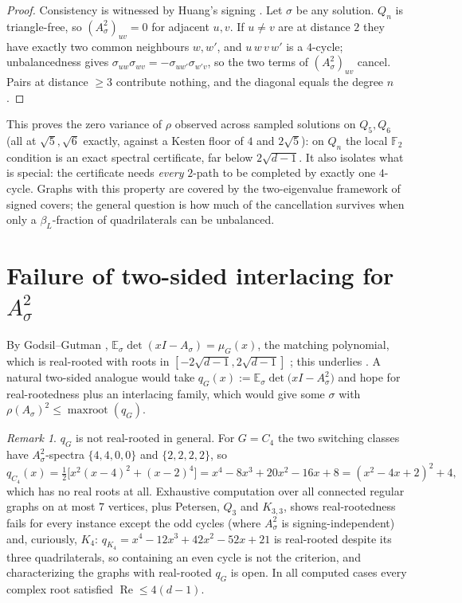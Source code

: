 \documentclass[11pt]{article}
\theoremstyle{remark}
\newtheorem{remark}[lemma]{Remark}
\newcommand{\F}{\mathbb{F}}
\newcommand{\rhomax}{\rho}
\begin{document}
\begin{proof}
Consistency is witnessed by Huang's signing \cite{huang19}. Let $\sigma$
be any solution. $Q_n$ is triangle-free, so
$(A_\sigma^2)_{uv}=0$ for adjacent $u,v$. If $u\ne v$ are at distance
$2$ they have exactly two common neighbours $w,w'$, and
$u\,w\,v\,w'$ is a $4$-cycle; unbalancedness gives
$\sigma_{uw}\sigma_{wv}=-\sigma_{uw'}\sigma_{w'v}$, so the two terms of
$(A_\sigma^2)_{uv}$ cancel. Pairs at distance $\ge3$ contribute nothing,
and the diagonal equals the degree $n$.
\end{proof}

This proves the zero variance of $\rhomax$ observed across sampled solutions on $Q_5,Q_6$ (all at $\sqrt5,\sqrt6$ exactly, against a Kesten
floor of $4$ and $2\sqrt5$): on $Q_n$ the local $\F_2$ condition is an
exact spectral certificate, far below $2\sqrt{d-1}$. It also isolates
what is special: the certificate needs \emph{every} $2$-path to be
completed by exactly one $4$-cycle. Graphs with this property are
covered by the two-eigenvalue framework of signed covers; the general
question is how much of the cancellation survives when only a
$\beta_L$-fraction of quadrilaterals can be unbalanced.


\section{Failure of two-sided interlacing for $A_\sigma^2$}

By Godsil--Gutman \cite{godsilgutman81},
$\mathbb{E}_\sigma\det(xI-A_\sigma)=\mu_G(x)$, the matching polynomial,
which is real-rooted with roots in $[-2\sqrt{d-1},2\sqrt{d-1}]$
\cite{heilmannlieb72}; this underlies \cite{mss15}. A natural two-sided
analogue would take
$q_G(x):=\mathbb{E}_\sigma\det\!\big(xI-A_\sigma^2\big)$ and hope for
real-rootedness plus an interlacing family, which would give some
$\sigma$ with $\rhomax(A_\sigma)^2\le\operatorname{maxroot}(q_G)$.

\begin{remark}\label{rem:qG}
$q_G$ is not real-rooted in general. For $G=C_4$ the two switching
classes have $A_\sigma^2$-spectra $\{4,4,0,0\}$ and $\{2,2,2,2\}$, so
\[
q_{C_4}(x)=\tfrac12\big[x^2(x-4)^2+(x-2)^4\big]
=x^4-8x^3+20x^2-16x+8=(x^2-4x+2)^2+4,
\]
which has no real roots at all. Exhaustive computation over all
connected regular graphs on at most $7$ vertices, plus Petersen, $Q_3$
and $K_{3,3}$, shows real-rootedness fails for every instance except the odd cycles
(where $A_\sigma^2$ is signing-independent) and, curiously, $K_4$:
$q_{K_4}=x^4-12x^3+42x^2-52x+21$ is real-rooted despite its three
quadrilaterals, so containing an even cycle is not the criterion, and
characterizing the graphs with real-rooted $q_G$ is open. In all
computed cases every complex root satisfied
$\operatorname{Re}\le4(d-1)$.
\end{remark}
\end{document}
